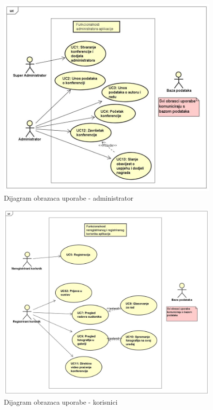 					\begin{figure}[H]
						\includegraphics[scale=0.45]{slike/UC_dijagram_administrator.JPG} %
						\centering
						\caption{Dijagram obrazaca uporabe - administrator}
						\label{fig:promjene}
					\end{figure}
					\begin{figure}[H]
						\includegraphics[scale=0.3]{slike/UC_dijagram_korisnik.JPG} %
						\centering
						\caption{Dijagram obrazaca uporabe - korisnici}
						\label{fig:promjene2}
					\end{figure}
				\eject		
				
